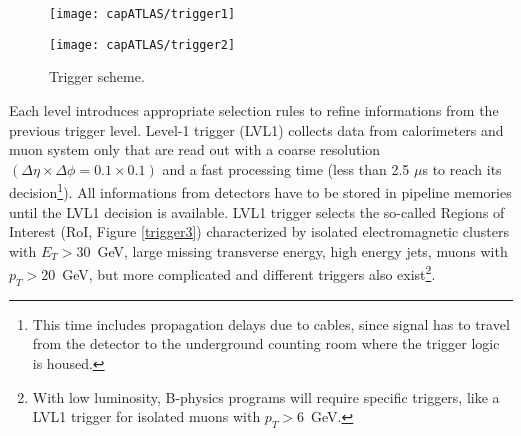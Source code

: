 \begin{figure}[hbt]\begin{center}\begin{minipage}{.45\textwidth}
\texttt{[image: capATLAS/trigger1]}
\end{minipage}\begin{minipage}{.55\textwidth}
\texttt{[image: capATLAS/trigger2]}
\end{minipage}
\caption{Trigger scheme. }\label{trigger1}
\end{center}\end{figure}

Each level introduces appropriate selection rules to refine informations from the previous trigger level. Level-1 trigger (LVL1) collects data from calorimeters and muon system only that are read out with a coarse resolution  $(\Delta\eta\times\Delta\phi = 0.1 \times 0.1)$ and a fast processing time (less than 2.5 $\mu$s to reach its decision\footnote{This time includes propagation delays due to cables, since signal has to travel from the detector to the underground counting room where the trigger logic is housed.}). All informations from detectors have to be stored in pipeline memories until the LVL1 decision is available. LVL1 trigger selects the so-called Regions of Interest (RoI, Figure \ref{trigger3}) characterized by isolated electromagnetic clusters with $E_{T} > 30$~GeV, large missing transverse energy, high energy jets, muons with $p_{T} > 20$~GeV, but more complicated and different triggers also exist\footnote{With low luminosity, B-physics programs will require specific triggers, like a LVL1 trigger for isolated muons with $p_{T} > 6$~GeV.}.%

